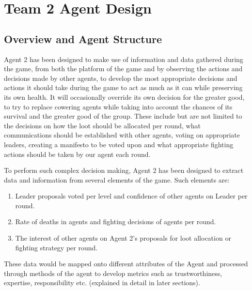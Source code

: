 
\chapter{Team 2 Agent Design}
\section{Overview and Agent Structure}
Agent 2 has been designed to make use of information and data gathered during the game, from both the platform of the game and by observing the actions and decisions made by other agents, to develop the most appropriate decisions and actions it should take during the game to act as much as it can while preserving its own health. It will occasionally override its own decision for the greater good, to try to replace cowering agents while taking into account the chances of its survival and the greater good of the group. These include but are not limited to the decisions on how the loot should be allocated per round, what communications should be established with other agents, voting on appropriate leaders, creating a manifesto to be voted upon and what appropriate fighting actions should be taken by our agent each round.

To perform such complex decision making, Agent 2 has been designed to extract data and information from several elements of the game. Such elements are:

\begin{enumerate}
    \item Leader proposals voted per level and confidence of other agents on Leader per round.
    \item Rate of deaths in agents and fighting decisions of agents per round.
    \item The interest of other agents on Agent 2's proposals for loot allocation or fighting strategy per round. 
\end{enumerate}

These data would be mapped onto different attributes of the Agent and processed through methods of the agent to develop metrics such as trustworthiness, expertise, responsibility etc. (explained in detail in later sections).

